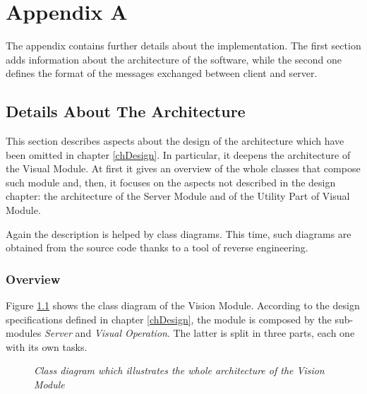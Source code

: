 \chapter{Appendix A}
	The appendix contains further details about the implementation.
	The first section adds information about the architecture of the software, while the second one defines the format of the messages exchanged between client and server.	
			

	\section{Details About The Architecture} \label{appA}
		This section describes aspects about the design of the architecture which have been omitted in chapter \ref{chDesign}.
		In particular, it deepens the architecture of the Visual Module.
		At first it gives an overview of the whole classes that compose such module and, then, it focuses on the aspects not described in the design chapter: the architecture of the Server Module and of the Utility Part of Visual Module.
		
		
		Again the description is helped by class diagrams. 
		This time, such diagrams are obtained from the source code thanks to a tool of reverse engineering.
	
		\subsection{Overview}\label{impl_arch}
		Figure \ref{fig:implementation_names} shows the class diagram of the Vision Module. 
		According to the design specifications defined in chapter \ref{chDesign}, the module is composed by the sub-modules \emph{Server} and \emph{Visual Operation}. 
		The latter is split in three parts, each one with its own tasks.

		\begin{figure}[h]
		  \begin{center} 
		  \end{center} 
		  \caption{\textit{Class diagram which illustrates the whole architecture of the Vision Module}}  
		  \label{fig:implementation_names}
	 	\end{figure}
 
